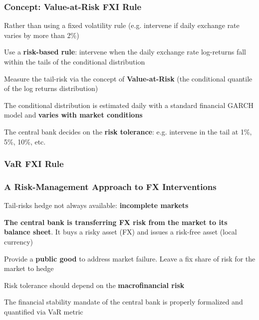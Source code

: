 \documentclass{beamer}
\newenvironment{largeitemize}{\itemize\addtolength{\itemsep}{10pt}}{\enditemize}
\begin{document}
\begin{frame}
  \frametitle{Concept: Value-at-Risk FXI Rule}
  \begin{largeitemize}
    \item Rather than using a fixed volatility rule (e.g. intervene if daily
      exchange rate varies by more than 2\%)
    \item Use a \textbf{risk-based rule}: intervene when the daily exchange
      rate log-returns fall within the
      tails of the conditional distribution
    \item Measure the tail-risk via the concept of \textbf{Value-at-Risk} (the
      conditional quantile of the log returns distribution) 
    \item The conditional distribution is estimated daily with a standard
      financial GARCH model and \textbf{varies with market conditions}
    \item The central bank decides on the \textbf{risk tolerance}:
      e.g. intervene in the tail at 1\%, 5\%, 10\%, etc.
  \end{largeitemize}
\end{frame}

\begin{frame}
  \frametitle{VaR FXI Rule}
\end{frame}

\begin{frame}
  \frametitle{A Risk-Management Approach to FX Interventions}
  \begin{largeitemize}    
  \item Tail-risks hedge not always available: \textbf{incomplete markets}
    \item \textbf{The central bank is transferring FX risk from the market to
      its balance sheet}. It buys a risky asset (FX) and issues a risk-free asset
      (local currency)    
    \item Provide a \textbf{public good} to address market failure. Leave a
      fix share of risk for the market to hedge 
    \item Risk tolerance should depend on the \textbf{macrofinancial risk} 
    \item The financial stability mandate of the central bank is properly
      formalized and quantified via VaR metric
  \end{largeitemize}  
\end{frame}
\end{document}
